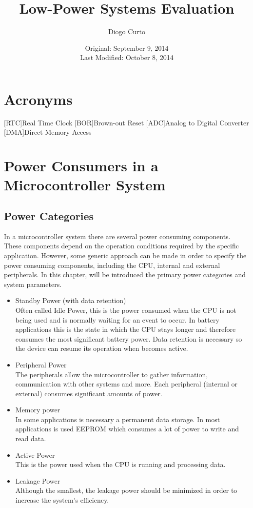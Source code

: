 \documentclass[11pt,a4paper]{report}
\author{Diogo Curto}
\title{Low-Power Systems Evaluation}
\date{Original: September 9, 2014 \\ Last Modified: October 8, 2014}
\begin{document}
\begin{titlepage}
\maketitle
\end{titlepage}
\tableofcontents
\chapter*{Acronyms}
\begin{acronym}
[RTC]{Real Time Clock}
[BOR]{Brown-out Reset}
[ADC]{Analog to Digital Converter}
[DMA]{Direct Memory Access}
\end{acronym}
\chapter{Power Consumers in a Microcontroller System}
\section{Power Categories}
In a microcontroller system there are several power consuming components. 
These components depend on the operation conditions required by the specific application.
However, some generic approach can be made in order to specify the power consuming components, including the CPU, 
internal and external peripherals. In this chapter, will be introduced the primary 
power categories and system parameters. \cite{Borgeson2012} \cite{Schulz2013}
\begin{itemize}
\item{Standby Power (with data retention)} \\
Often called Idle Power, this is the power consumed when the CPU is not being used and is normally waiting for an event to occur. In battery applications this is the state in which the CPU stays longer and therefore consumes the most significant battery power. Data retention is necessary so the device can resume its operation when becomes active.
\item Peripheral Power\\
The peripherals allow the microcontroller to gather information, communication with other systems and more. Each peripheral (internal or external) consumes significant amounts of power. 
\item Memory power\\
In some applications is necessary a permanent data storage. In most applications is used EEPROM which consumes a lot of power to write and read data.
\item Active Power\\
This is the power used when the CPU is running and processing data.
\item Leakage Power\\
Although the smallest, the leakage power should be minimized in order to increase the system's efficiency.
\end{itemize}
\end{document}
